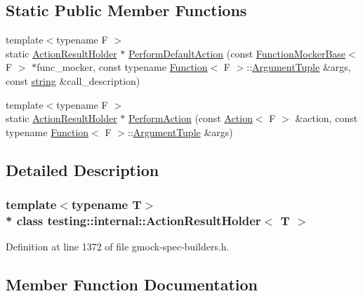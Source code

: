 \subsection*{Static Public Member Functions}
\begin{DoxyCompactItemize}
\item 
{\footnotesize template$<$typename F $>$ }\\static \hyperlink{classtesting_1_1internal_1_1_action_result_holder}{Action\+Result\+Holder} $\ast$ \hyperlink{classtesting_1_1internal_1_1_action_result_holder_a9609dcb5fb16271f83d777b087075272}{Perform\+Default\+Action} (const \hyperlink{classtesting_1_1internal_1_1_function_mocker_base}{Function\+Mocker\+Base}$<$ F $>$ $\ast$func\+\_\+mocker, const typename \hyperlink{structtesting_1_1internal_1_1_function}{Function}$<$ F $>$\+::\hyperlink{typedefs__d_8js_a396b2bdc7ef45f482a7e9254b15c3c01}{Argument\+Tuple} \&args, const \hyperlink{namespacetesting_1_1internal_a8e8ff5b11e64078831112677156cb111}{string} \&call\+\_\+description)
\item 
{\footnotesize template$<$typename F $>$ }\\static \hyperlink{classtesting_1_1internal_1_1_action_result_holder}{Action\+Result\+Holder} $\ast$ \hyperlink{classtesting_1_1internal_1_1_action_result_holder_a9e10aff754b5caf69b14964f3c9c79ec}{Perform\+Action} (const \hyperlink{classtesting_1_1_action}{Action}$<$ F $>$ \&action, const typename \hyperlink{structtesting_1_1internal_1_1_function}{Function}$<$ F $>$\+::\hyperlink{typedefs__d_8js_a396b2bdc7ef45f482a7e9254b15c3c01}{Argument\+Tuple} \&args)
\end{DoxyCompactItemize}


\subsection{Detailed Description}
\subsubsection*{template$<$typename T$>$\\*
class testing\+::internal\+::\+Action\+Result\+Holder$<$ T $>$}



Definition at line 1372 of file gmock-\/spec-\/builders.\+h.



\subsection{Member Function Documentation}
